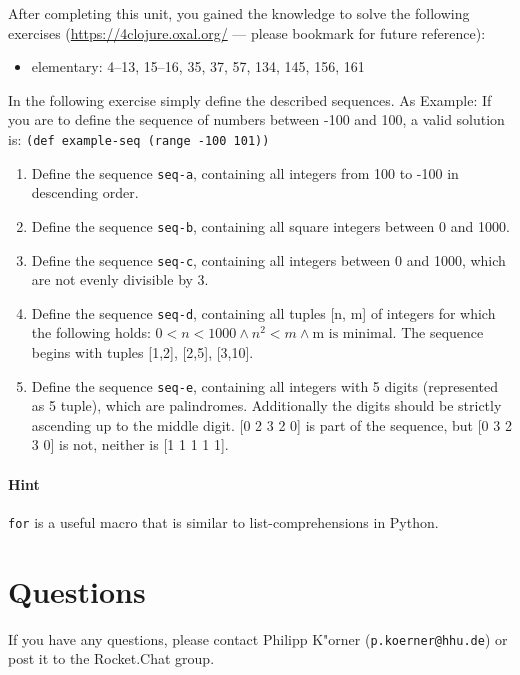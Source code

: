 \documentclass[11pt,a4paper]{article}
\begin{document}
\begin{exercise}
    After completing this unit, you gained the knowledge to solve the following exercises (\url{https://4clojure.oxal.org/} --- please bookmark for future reference):

    \begin{itemize}
        \item elementary: 4--13, 15--16, 35, 37, 57, 134, 145, 156, 161
    \end{itemize}
\end{exercise}

\begin{exercise}[Sequences]

In the following exercise simply define the described sequences. As Example: If you are to define the sequence of numbers between -100 and 100, a valid solution is: \texttt{(def example-seq (range -100 101))}
  

\begin{enumerate}[label=\alph*)]
  \item Define the sequence \verb|seq-a|, containing all integers from 100 to -100 in descending order.
  \item Define the sequence \verb|seq-b|, containing all square integers between 0 and 1000.
  \item Define the sequence \verb|seq-c|, containing all integers between 0 and 1000, which are not evenly divisible by 3.
  \item Define the sequence \verb|seq-d|, containing all tuples [n, m] of integers for which the following holds: $0 < n < 1000 \wedge n^2 < m \wedge \text{m is minimal}$.  The sequence begins with tuples [1,2], [2,5], [3,10].
  \item Define the sequence \verb|seq-e|, containing all integers with 5 digits (represented as 5 tuple), which are palindromes. Additionally the digits should be strictly ascending up to the middle digit. [0 2 3 2 0] is part of the sequence, but [0 3 2 3 0] is not, neither is [1 1 1 1 1].
  
    
  \end{enumerate}

    \paragraph{Hint} \verb|for| is a useful macro that is similar to list-comprehensions in Python. 

\end{exercise}





	\section*{Questions}
	If you have any questions, please contact Philipp K"orner (\texttt{p.koerner@hhu.de}) or post it to the Rocket.Chat group.
\end{document}
